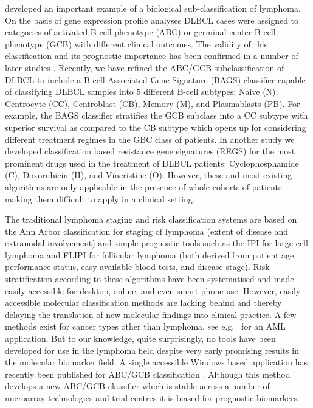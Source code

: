 \documentclass{article}
\begin{document}
\citet{Alizadeh2000} developed an important example of a biological sub-classification of lymphoma.
On the basis of gene expression profile analyses DLBCL cases were assigned to categories of activated B-cell phenotype (ABC) or germinal center B-cell phenotype (GCB) with different clinical outcomes.
The validity of this classification and its prognostic importance has been confirmed in a number of later studies \citep{Rosenwald2002a,Hans2004,Lenz2008a,Monti2012a}.
Recently, we have refined the ABC/GCB subclassification of DLBCL to include a B-cell Associated Gene Signature (BAGS) classifier capable of classifying DLBCL samples into $5$ different B-cell subtypes: Naive (N), Centrocyte (CC), Centroblast (CB), Memory (M), and Plasmablasts (PB).
For example, the BAGS classifier stratifies the GCB subclass into a CC subtype with superior survival as compared to the CB subtype \citep{DybkaerBoegsted2015} which opens up for considering different treatment regimes in the GBC class of patients.
In another study \citep{Falgreen2015} we developed classification based resistance gene signatures (REGS) for the most prominent drugs used in the treatment of DLBCL patients: Cyclophosphamide (C), Doxorubicin (H), and Vincristine (O).
However, these and most existing algorithms are only applicable in the presence of whole cohorts of patients making them difficult to apply in a clinical setting.

The traditional lymphoma staging and risk classification systems are based on the Ann Arbor classification for staging of lymphoma (extent of disease and extranodal involvement) and simple prognostic tools such as the IPI for large cell lymphoma and FLIPI for follicular lymphoma (both derived from patient age, performance status, easy available blood tests, and disease stage).
Risk stratification according to these algorithms have been systematised and made easily accessible for desktop, online, and even smart-phone use.
However, easily accessible molecular classification methods are lacking behind and thereby delaying the translation of new molecular findings into clinical practice.
A few methods exist for cancer types other than lymphoma, see e.g.\ \citep{Huang2009} for an AML application.
But to our knowledge, quite surprisingly, no tools have been developed for use in the lymphoma field despite very early promising results in the molecular biomarker field.
A single accessible Windows based application has recently been published for ABC/GCB classification \citep{Care2013}.
Although this method develops a new ABC/GCB classifier which is stable across a number of microarray technologies and trial centres it is biased for prognostic biomarkers.
\end{document}
